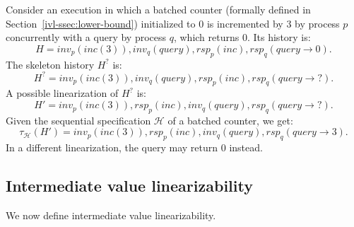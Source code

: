 \begin{example}

Consider an execution in which a batched counter (formally defined in Section~\ref{ivl-ssec:lower-bound}) initialized to $0$
is incremented by $3$ by process $p$ concurrently with a query by
process $q$, which returns $0$. Its history is:
\[ H = inv_p(inc(3)), inv_q(query), rsp_p(inc), rsp_q(query \rightarrow 0). \]
The skeleton history $H^?$ is:
\[ H^? = inv_p(inc(3)), inv_q(query), rsp_p(inc), rsp_q(query \rightarrow ?). \]
A possible linearization of $H^?$ is:
\[ H'=inv_p(inc(3)), rsp_p(inc), inv_q(query), rsp_q(query \rightarrow ?). \]
Given the sequential specification $\mathcal{H}$ of a batched counter,
we get:
\[ \tau_\mathcal{H}(H')=inv_p(inc(3)), rsp_p(inc), inv_q(query), rsp_q(query \rightarrow 3). \]
In a different linearization, the query may return $0$ instead.

\end{example}

\subsection{Intermediate value linearizability}
\label{ivl-ssec:ivl}


We now define intermediate value linearizability.

